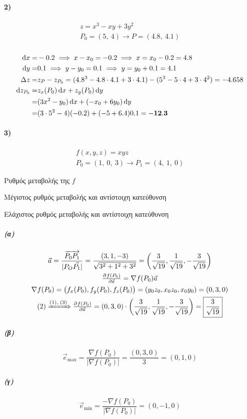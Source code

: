 \documentclass[11pt,a4paper,titlepage]{article}
\begin{document}
\paragraph{2)}
\begin{gather*}
z=x^3-xy+3y^2\\
P_0=(5,\ 4) \rightarrow P=(4.8,\ 4.1)
\end{gather*}
\subparagraph{}
\begin{align*}
\dif x =& -0.2 \implies x-x_0 = -0.2 \implies x=x_0-0.2=4.8\\
\dif y =&  0.1 \implies y-y_0 =  0.1 \implies y=y_0+0.1=4.1\\
\Delta z =& z_P -z_{P_0} = (4.8^3-4.8\cdot4.1+3\cdot4.1)-(5^3-5\cdot 4 + 3 \cdot 4^2) = -4.658\\
\dif z_{P_0} =& z_x(P_0)\dif x + z_y(P_0)\dif y \\
=&(3x^2-y_0)\dif x+(-x_0+6y_0)\dif y\\
=& (3\cdot5^2-4)(-0.2)+(-5+6.4)0.1 = \mathbf{-12.3}
\end{align*}

\paragraph{3)}
\begin{gather*}
f(x,y,z)=xyz\\
P_0=(1,\ 0,\ 3) \rightarrow P_1 =(4,\ 1,\ 0)
\end{gather*}
\begin{enumparen}
\item Ρυθμός μεταβολής της $f$
\item Μέγιστος ρυθμός μεταβολής και αντίστοιχη κατεύθυνση
\item Ελάχιστος ρυθμός μεταβολής και αντίστοιχη κατεύθυνση
\end{enumparen}
\subparagraph{(α)}
\begin{gather}
\vec a = \frac{\overrightarrow{P_0P_1}}{|P_O\vec{P_1}|}=\frac{(3,1,-3)}{\sqrt{3^2+1^2+3^2}}=\left(
\frac{3}{\sqrt{19}},\frac{1}{\sqrt{19}},-\frac{3}{\sqrt{19}}
\right)\\
\pd{f(P_0)}{\vec a} = \nabla f(P_0)\vec a\\
\nabla f(P_0) = \left(f_x(P_0),f_y(P_0),f_z(P_0)\right) = (y_0z_0,x_0z_0,x_0y_0) = (0,3,0)
\\
(2)\xRightarrow{(1),\; (3)}\pd{f(P_0)}{\vec{a}} = (0,3,0)\cdot\left(
\frac{3}{\sqrt{19}},\frac{1}{\sqrt{19}},-\frac{3}{\sqrt{19}}\right)=\boxed{\frac{3}{\sqrt{19}}}
\end{gather}
\subparagraph{(β)}
\[
\vec e_{\max} = \frac{\nabla f(P_0)}{\left| \nabla f(P_0) \right|}=\frac{(0,3,0)}{3}=(0,1,0)
\]
\subparagraph{(γ)}
\[
\vec e_{\min} = \frac{-\nabla f(P_0)}{|\nabla f(P_0)|}=(0,-1,0)
\]
\end{document}
